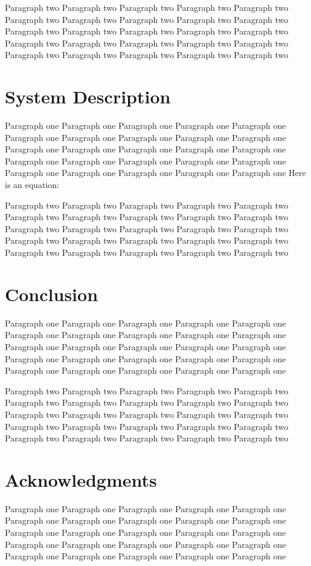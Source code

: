 \documentclass[10pt,journal,final,a4paper,nofonttune]{IEEEtran}
\begin{document}
Paragraph two Paragraph two Paragraph two Paragraph two Paragraph two 
Paragraph two Paragraph two Paragraph two Paragraph two Paragraph two 
Paragraph two Paragraph two Paragraph two Paragraph two Paragraph two 
Paragraph two Paragraph two Paragraph two Paragraph two Paragraph two 
Paragraph two Paragraph two Paragraph two Paragraph two Paragraph two 

\section{System Description}

Paragraph one Paragraph one Paragraph one Paragraph one Paragraph one 
Paragraph one Paragraph one Paragraph one Paragraph one Paragraph one 
Paragraph one Paragraph one Paragraph one Paragraph one Paragraph one 
Paragraph one Paragraph one Paragraph one Paragraph one Paragraph one 
Paragraph one Paragraph one Paragraph one Paragraph one Paragraph one 
Here is an equation: 

Paragraph two Paragraph two Paragraph two Paragraph two Paragraph two 
Paragraph two Paragraph two Paragraph two Paragraph two Paragraph two 
Paragraph two Paragraph two Paragraph two Paragraph two Paragraph two 
Paragraph two Paragraph two Paragraph two Paragraph two Paragraph two 
Paragraph two Paragraph two Paragraph two Paragraph two Paragraph two 

\section{Conclusion}

Paragraph one Paragraph one Paragraph one Paragraph one Paragraph one 
Paragraph one Paragraph one Paragraph one Paragraph one Paragraph one 
Paragraph one Paragraph one Paragraph one Paragraph one Paragraph one 
Paragraph one Paragraph one Paragraph one Paragraph one Paragraph one 
Paragraph one Paragraph one Paragraph one Paragraph one Paragraph one 

Paragraph two Paragraph two Paragraph two Paragraph two Paragraph two 
Paragraph two Paragraph two Paragraph two Paragraph two Paragraph two 
Paragraph two Paragraph two Paragraph two Paragraph two Paragraph two 
Paragraph two Paragraph two Paragraph two Paragraph two Paragraph two 
Paragraph two Paragraph two Paragraph two Paragraph two Paragraph two 

\section*{Acknowledgments}

Paragraph one Paragraph one Paragraph one Paragraph one Paragraph one 
Paragraph one Paragraph one Paragraph one Paragraph one Paragraph one 
Paragraph one Paragraph one Paragraph one Paragraph one Paragraph one 
Paragraph one Paragraph one Paragraph one Paragraph one Paragraph one 
Paragraph one Paragraph one Paragraph one Paragraph one Paragraph one 



\end{document}
